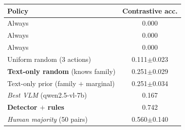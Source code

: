 \setlength{\tabcolsep}{4pt}
\begin{tabular}{lc}
\toprule
Policy & Contrastive acc. \\
\midrule
Always \ans{} & 0.000 \\
Always \ask{} & 0.000 \\
Always \abs{} & 0.000 \\
Uniform random (3 actions) & 0.111$\pm$0.023 \\
\textbf{Text-only random} (knows family) & 0.251$\pm$0.029 \\
Text-only prior (family $+$ marginal) & 0.251$\pm$0.034 \\
\emph{Best VLM} (qwen2.5-vl-7b) & 0.167 \\
\textbf{Detector $+$ rules} & 0.742 \\
\emph{Human majority} (50 pairs) & 0.560$\pm$0.140 \\
\bottomrule
\end{tabular}
